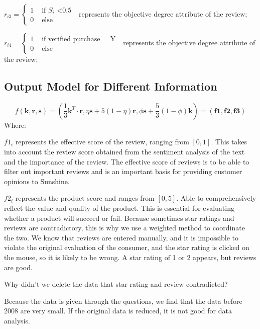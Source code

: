 \documentclass{mcmthesis}
\begin{document}
$
r_{i3}=\left\{\begin{array}{ll}
1 & \text { if $S_i$ <0.5  } \\
0 & \text { else }
\end{array}\right.
$
represents the objective degree attribute of the review;

$
r_{i4}=\left\{\begin{array}{ll}
1 & \text { if verified purchase = Y } \\
0 & \text { else }
\end{array}\right.
$
represents the objective degree attribute of the review;

\subsection{Output Model for Different Information}

\begin{equation}\label{q1}
f(\boldsymbol{k},\boldsymbol{r},\boldsymbol{s})=(\frac{1}{3}\boldsymbol{k}^T\cdot \boldsymbol{r},\eta \boldsymbol{s} + 5(1-\eta)\boldsymbol{r},\phi\boldsymbol{s} + \frac{5}{3}(1-\phi)\boldsymbol{k})=(\boldsymbol{f1},\boldsymbol{f2},\boldsymbol{f3})
\end{equation}
Where:

$f1_i$ represents the effective score of the review, ranging from $[0,1]$. This takes into account the review score obtained from the sentiment analysis of the text and the importance of the review. The effective score of reviews is to be able to filter out important reviews and is an important basis for providing customer opinions to Sunshine.

$f2_i$ represents the product score and ranges from $[0,5]$. Able to comprehensively reflect the value and quality of the product. This is essential for evaluating whether a product will succeed or fail. Because sometimes star ratings and reviews are contradictory, this is why we use a weighted method to coordinate the two. We know that reviews are entered manually, and it is impossible to violate the original evaluation of the consumer, and the star rating is clicked on the mouse, so it is likely to be wrong. A star rating of 1 or 2 appears, but reviews are good.

Why didn't we delete the data that star rating and review contradicted?

Because the data is given through the questions, we find that the data before 2008 are very small. If the original data is reduced, it is not good for data analysis.
\end{document}
